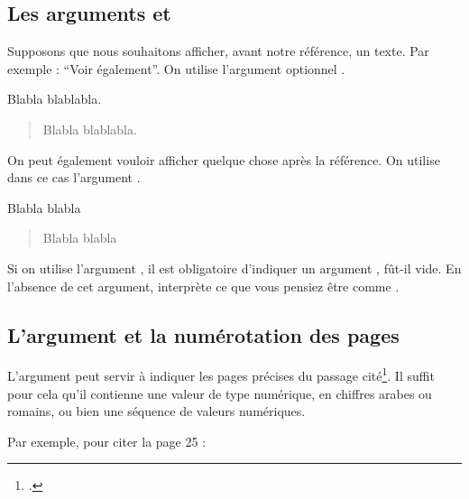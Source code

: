 \subsection{Les arguments  et }

Supposons que nous souhaitons afficher, avant notre référence, un texte. Par exemple : \enquote{Voir également}. On utilise l'argument optionnel .

\begin{latexcode}
Blabla \autocite[Voir également][]{Saxer1980} blablabla.
\end{latexcode}

\begin{quotation}
Blabla \cite[Voir également][]{Saxer1980} blablabla.
\end{quotation}



On peut également vouloir afficher quelque chose après la référence. On utilise dans ce cas l'argument .

\begin{latexcode}
Blabla \autocite[Voir également][qui porte sur un
sujet similaire.]{Saxer1980} blabla
\end{latexcode}

\begin{quotation}
Blabla \cite[Voir également][qui porte sur un sujet similaire.]{Saxer1980} blabla
\end{quotation}

\begin{attention}
Si on utilise l'argument , il est obligatoire d'indiquer un argument , fût-il vide. En l'absence de cet argument,  interprète  ce que vous pensiez être  comme .
\end{attention}

\subsection{L'argument  et la numérotation des pages}\label{pagespostnote}

L'argument  peut servir à indiquer les pages précises du passage cité\footcite[On consultera pour plus de détails : ][]{biblatex_pages}. Il suffit pour cela qu'il contienne une valeur de type numérique, en chiffres arabes ou romains, ou bien une séquence de valeurs numériques.

Par exemple, pour citer la page 25 : 

